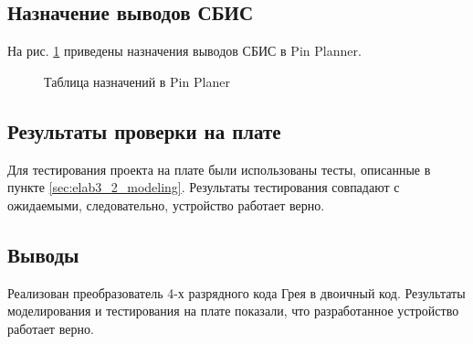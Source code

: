 \subsection{Назначение выводов СБИС}

На рис. \ref{fig:elab3_2_pins} приведены назначения выводов СБИС в Pin Planner.

\begin{figure}[H]
\begin{center}
	\caption{Таблица назначений в Pin Planer}
	\label{fig:elab3_2_pins}
\end{center}
\end{figure}

\subsection{Результаты проверки на плате}

Для тестирования проекта на плате были использованы тесты, описанные в пункте \ref{sec:elab3_2_modeling}. Результаты тестирования совпадают с ожидаемыми, следовательно, устройство работает верно.

\subsection{Выводы}

Реализован преобразователь 4-х разрядного кода Грея в двоичный код. Результаты моделирования и тестирования на плате показали, что разработанное устройство работает верно.


